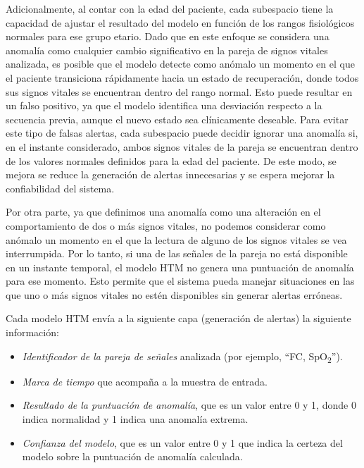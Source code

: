 Adicionalmente, al contar con la edad del paciente, cada subespacio tiene la capacidad de ajustar el resultado del modelo en función de los rangos fisiológicos normales para ese grupo etario. Dado que en este enfoque se considera una anomalía como cualquier cambio significativo en la pareja de signos vitales analizada, es posible que el modelo detecte como anómalo un momento en el que el paciente transiciona rápidamente hacia un estado de recuperación, donde todos sus signos vitales se encuentran dentro del rango normal. Esto puede resultar en un falso positivo, ya que el modelo identifica una desviación respecto a la secuencia previa, aunque el nuevo estado sea clínicamente deseable. Para evitar este tipo de falsas alertas, cada subespacio puede decidir ignorar una anomalía si, en el instante considerado, ambos signos vitales de la pareja se encuentran dentro de los valores normales definidos para la edad del paciente. De este modo, se mejora se reduce la generación de alertas innecesarias y se espera mejorar la confiabilidad del sistema.

Por otra parte, ya que definimos una anomalía como una alteración en el comportamiento de dos o más signos vitales, no podemos considerar como anómalo un momento en el que la lectura de alguno de los signos vitales se vea interrumpida. Por lo tanto, si una de las señales de la pareja no está disponible en un instante temporal, el modelo HTM no genera una puntuación de anomalía para ese momento. Esto permite que el sistema pueda manejar situaciones en las que uno o más signos vitales no estén disponibles sin generar alertas erróneas.

Cada modelo HTM envía a la siguiente capa (generación de alertas) la siguiente información:

\begin{itemize}
  \item \emph{Identificador de la pareja de señales} analizada (por ejemplo, “FC, SpO\textsubscript{2}”).
  \item \emph{Marca de tiempo} que acompaña a la muestra de entrada.
  \item \emph{Resultado de la puntuación de anomalía}, que es un valor entre 0 y 1, donde 0 indica normalidad y 1 indica una anomalía extrema.
  \item \emph{Confianza del modelo}, que es un valor entre 0 y 1 que indica la certeza del modelo sobre la puntuación de anomalía calculada.
\end{itemize}

\bigskip

